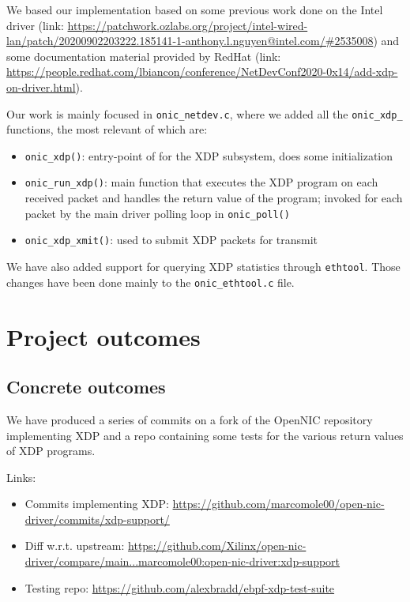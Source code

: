 \documentclass[10pt,a4]{article}
\begin{document}

We based our implementation based on some previous work done on the Intel
driver (link: \url{https://patchwork.ozlabs.org/project/intel-wired-lan/patch/20200902203222.185141-1-anthony.l.nguyen@intel.com/#2535008})
and some documentation material provided by RedHat (link: \url{https://people.redhat.com/lbiancon/conference/NetDevConf2020-0x14/add-xdp-on-driver.html}).

Our work is mainly focused in \texttt{onic\_netdev.c}, where we added all the
\texttt{onic\_xdp\_\*} functions, the most relevant of which are:

\begin{itemize}
  \item \texttt{onic\_xdp()}: entry-point of for the XDP subsystem, does some
    initialization
  \item \texttt{onic\_run\_xdp()}: main function that executes the XDP program
    on each received packet and handles the return value of the program; invoked
    for each packet by the main driver polling loop in \texttt{onic\_poll()}
  \item \texttt{onic\_xdp\_xmit()}: used to submit XDP packets for transmit
\end{itemize}

We have also added support for querying XDP statistics through \texttt{ethtool}.
Those changes have been done mainly to the \texttt{onic\_ethtool.c} file.


\section{Project outcomes}

\subsection{Concrete outcomes}
%

We have produced a series of commits on a fork of the OpenNIC repository
implementing XDP and a repo containing some tests for the various return
values of XDP programs.

Links:

\begin{itemize}
  \item Commits implementing XDP: \url{https://github.com/marcomole00/open-nic-driver/commits/xdp-support/}
  \item Diff w.r.t. upstream: \url{https://github.com/Xilinx/open-nic-driver/compare/main...marcomole00:open-nic-driver:xdp-support}
  \item Testing repo: \url{https://github.com/alexbradd/ebpf-xdp-test-suite}
\end{itemize}
\end{document}
